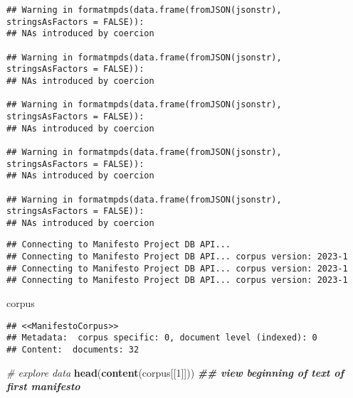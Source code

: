 \documentclass[
]{article}
\newenvironment{Shaded}{\begin{snugshade}}{\end{snugshade}}
\newcommand{\CommentTok}[1]{\textcolor[rgb]{0.56,0.35,0.01}{\textit{#1}}}
\newcommand{\DecValTok}[1]{\textcolor[rgb]{0.00,0.00,0.81}{#1}}
\newcommand{\DocumentationTok}[1]{\textcolor[rgb]{0.56,0.35,0.01}{\textbf{\textit{#1}}}}
\newcommand{\FunctionTok}[1]{\textcolor[rgb]{0.13,0.29,0.53}{\textbf{#1}}}
\newcommand{\NormalTok}[1]{#1}
\begin{document}
\begin{verbatim}
## Warning in formatmpds(data.frame(fromJSON(jsonstr), stringsAsFactors = FALSE)):
## NAs introduced by coercion

## Warning in formatmpds(data.frame(fromJSON(jsonstr), stringsAsFactors = FALSE)):
## NAs introduced by coercion

## Warning in formatmpds(data.frame(fromJSON(jsonstr), stringsAsFactors = FALSE)):
## NAs introduced by coercion

## Warning in formatmpds(data.frame(fromJSON(jsonstr), stringsAsFactors = FALSE)):
## NAs introduced by coercion

## Warning in formatmpds(data.frame(fromJSON(jsonstr), stringsAsFactors = FALSE)):
## NAs introduced by coercion
\end{verbatim}

\begin{verbatim}
## Connecting to Manifesto Project DB API... 
## Connecting to Manifesto Project DB API... corpus version: 2023-1 
## Connecting to Manifesto Project DB API... corpus version: 2023-1 
## Connecting to Manifesto Project DB API... corpus version: 2023-1
\end{verbatim}

\begin{Shaded}
\begin{Highlighting}[]
\NormalTok{corpus}
\end{Highlighting}
\end{Shaded}

\begin{verbatim}
## <<ManifestoCorpus>>
## Metadata:  corpus specific: 0, document level (indexed): 0
## Content:  documents: 32
\end{verbatim}

\begin{Shaded}
\begin{Highlighting}[]
\CommentTok{\# explore data}
\FunctionTok{head}\NormalTok{(}\FunctionTok{content}\NormalTok{(corpus[[}\DecValTok{1}\NormalTok{]])) }\DocumentationTok{\#\# view beginning of text of first manifesto}
\end{Highlighting}
\end{Shaded}
\end{document}
